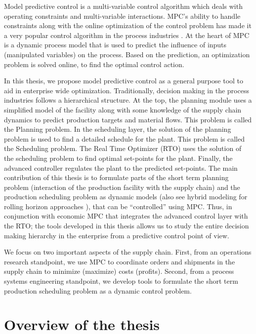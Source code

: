 Model predictive control is a multi-variable control
algorithm which deals with operating constraints and multi-variable interactions. MPC's ability to handle constraints along
with the online optimization of the control problem has made it a very
popular control algorithm in the process industries
\citep{qin:badgwell:2003,morari:lee:1997}. At the heart of MPC is a
dynamic process model that is used to predict the influence of inputs
(manipulated variables) on the process. Based on the prediction, an
optimization problem is solved online, to find the optimal control
action.  


In this thesis, we propose  model predictive control as a
general purpose tool to aid in enterprise wide
optimization. Traditionally, decision making in the process industries
follows a hierarchical structure. At the top, the planning module uses a
simplified model of the facility along with some knowledge of the
supply chain dynamics to predict production targets and material
flows. This problem is called the Planning problem. In the scheduling
layer, the solution of the planning problem is used to find a detailed
schedule for the plant. This problem is called the Scheduling problem.
The Real Time Optimizer (RTO) uses the solution of the scheduling
problem to find  optimal set-points for the plant.  Finally, the
advanced controller regulates the plant to the predicted set-points. The main contribution of this
thesis is to formulate parts of the short term planning problem (interaction of
the production facility with the supply chain) and the production scheduling
problem as dynamic models (also see hybrid modeling for rolling
horizon approaches \citep[Sec 4.4]{maravelias:sung:2009}), that can be ``controlled'' using MPC. Thus,
in conjunction with economic MPC \citep{amrit:rawlings:angeli:2011} that integrates the advanced control
layer with the RTO; the tools developed in this thesis allows us to
study the entire decision making  hierarchy in the enterprise from a predictive control
point of view.  
 
We focus   on two important aspects of the supply
chain. First, from an operations
research standpoint, we use MPC to coordinate 
orders and shipments in the supply chain to minimize (maximize) costs
(profits). Second, from a process systems engineering standpoint, we
develop tools to formulate the short term production scheduling problem as a dynamic control problem.

\section*{Overview of the thesis}

